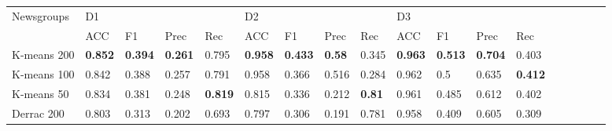 \begin{landscape}
\begin{table}[]

	\begin{tabular}{lll@{\hskip 0.15in}lllllllllllllll}
		Newsgroups  & D1                              &                     &                      &                   & D2                              &         &                  &                     & D3                                             \\
	& ACC                             & F1                              & Prec                             & Rec                              & ACC                             & F1                                                        & Prec                             & Rec                              & ACC                             & F1                              & Prec                             & Rec                                    \\
		\toprule
		K-means 200 & \textbf{0.852} & \textbf{0.394} & \textbf{0.261} & 0.795                           & \textbf{0.958} & \textbf{0.433} & \textbf{0.58} & 0.345                           & \textbf{0.963} & \textbf{0.513} & \textbf{0.704} & 0.403               \\
		K-means 100 & 0.842                           & 0.388                           & 0.257                           & 0.791                           & 0.958                           & 0.366                           & 0.516                          & 0.284                           & 0.962                           & 0.5                             & 0.635                           & \textbf{0.412}            \\
		K-means 50  & 0.834                           & 0.381                           & 0.248                           & \textbf{0.819} & 0.815                           & 0.336                           & 0.212                          & \textbf{0.81}  & 0.961                           & 0.485                           & 0.612                           & 0.402                     \\
		\midrule
		Derrac 200  & 0.803                           & 0.313                           & 0.202                           & 0.693                           & 0.797                           & 0.306                           & 0.191                          & 0.781                           & 0.958                           & 0.409                           & 0.605                           & 0.309                      \\

\end{tabular}
\end{table}
\end{landscape}
